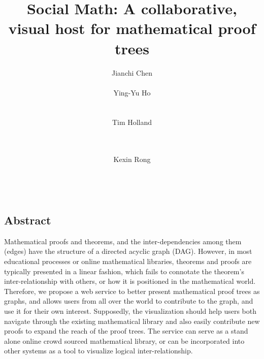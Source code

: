 \documentclass{acm_proc_article-sp}
\begin{document}
\title{\Large \bf Social Math: A collaborative, visual host for mathematical proof trees}
%
\author{
\alignauthor
Jianchi Chen\\
       \\
\alignauthor
Ying-Yu Ho\\
       \\
       \\
\alignauthor
Tim Holland\\
       \\
       \\
\and  %
\alignauthor 
Kexin Rong\\
       \\
      \\
}

\maketitle

\thispagestyle{empty}

\subsection*{Abstract}
Mathematical proofs and theorems, and the inter-dependencies among them (edges) have the structure of a directed acyclic graph (DAG). However, in most educational processes or online mathematical libraries, theorems and proofs are typically presented in a linear fashion, which fails to connotate the theorem's inter-relationship with others, or how it is positioned in the mathematical world. Therefore, we propose a web service to better present mathematical proof trees as graphs, and allows users from all over the world to contribute to the graph, and use it for their own interest. Supposedly, the visualization should  help users both navigate through the existing mathematical library and also easily contribute new proofs to expand the reach of the proof trees. The service can serve as a stand alone online crowd sourced mathematical library, or can be incorporated into other systems as a tool to visualize logical inter-relationship. 
\end{document}
